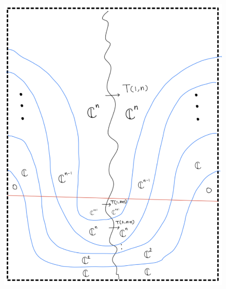 \begin{enumerate}[label=(\roman*)]
\begin{enumerate}[label=(Step \arabic*)]
\begin{figure}[H]
    \centering
    \includegraphics[scale = 0.95]{diagrams/cobord6/7.png}
    \caption{}
    \label{fig:your-label}
\end{figure}
\end{enumerate}
\end{enumerate}